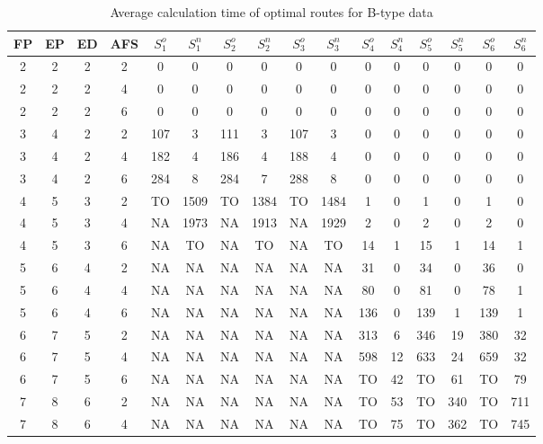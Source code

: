 \begin{longtable}{|c|c|c|c|c c|c c|c c|c c|c c|c c|}
\caption{Average calculation time of optimal routes for B-type data}
\label{tab:avg_time_b} \\
\hline
 FP & EP & ED & AFS & $S^o_1$ & $S^n_1$ & $S^o_2$ & $S^n_2$ & $S^o_3$ & $S^n_3$ & $S^o_4$ & $S^n_4$ & $S^o_5$ & $S^n_5$ & $S^o_6$ & $S^n_6$ \\
\hline\hline
2 & 2 & 2 & 2 & 0 & 0 & 0 & 0 & 0 & 0 & 0 & 0 & 0 & 0 & 0 & 0 \\
\hline
2 & 2 & 2 & 4 & 0 & 0 & 0 & 0 & 0 & 0 & 0 & 0 & 0 & 0 & 0 & 0 \\
\hline
2 & 2 & 2 & 6 & 0 & 0 & 0 & 0 & 0 & 0 & 0 & 0 & 0 & 0 & 0 & 0 \\
\hline
3 & 4 & 2 & 2 & 107 & 3 & 111 & 3 & 107 & 3 & 0 & 0 & 0 & 0 & 0 & 0 \\
\hline
3 & 4 & 2 & 4 & 182 & 4 & 186 & 4 & 188 & 4 & 0 & 0 & 0 & 0 & 0 & 0 \\
\hline
3 & 4 & 2 & 6 & 284 & 8 & 284 & 7 & 288 & 8 & 0 & 0 & 0 & 0 & 0 & 0 \\
\hline
4 & 5 & 3 & 2 & TO & 1509 & TO & 1384 & TO & 1484 & 1 & 0 & 1 & 0 & 1 & 0 \\
\hline
4 & 5 & 3 & 4 & NA & 1973 & NA & 1913 & NA & 1929 & 2 & 0 & 2 & 0 & 2 & 0 \\
\hline
4 & 5 & 3 & 6 & NA & TO & NA & TO & NA & TO & 14 & 1 & 15 & 1 & 14 & 1 \\
\hline
5 & 6 & 4 & 2 & NA & NA & NA & NA & NA & NA & 31 & 0 & 34 & 0 & 36 & 0 \\
\hline
5 & 6 & 4 & 4 & NA & NA & NA & NA & NA & NA & 80 & 0 & 81 & 0 & 78 & 1 \\
\hline
5 & 6 & 4 & 6 & NA & NA & NA & NA & NA & NA & 136 & 0 & 139 & 1 & 139 & 1 \\
\hline
6 & 7 & 5 & 2 & NA & NA & NA & NA & NA & NA & 313 & 6 & 346 & 19 & 380 & 32 \\
\hline
6 & 7 & 5 & 4 & NA & NA & NA & NA & NA & NA & 598 & 12 & 633 & 24 & 659 & 32 \\
\hline
6 & 7 & 5 & 6 & NA & NA & NA & NA & NA & NA & TO & 42 & TO & 61 & TO & 79 \\
\hline
7 & 8 & 6 & 2 & NA & NA & NA & NA & NA & NA & TO & 53 & TO & 340 & TO & 711 \\
\hline
7 & 8 & 6 & 4 & NA & NA & NA & NA & NA & NA & TO & 75 & TO & 362 & TO & 745 \\
\hline
\end{longtable}
